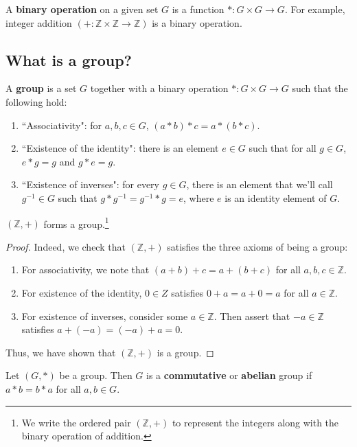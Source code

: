 \documentclass{article}
\theoremstyle{plain}
\newcommand{\Z}{\mathbb{Z}}
\begin{document}
\begin{definition}{}{}
A \textbf{binary operation} on a given set $G$ is a function $* : G \times G \rightarrow G$. For example, integer addition $(+ : \Z \times \Z \rightarrow \Z)$ is a binary operation.
\end{definition}

\subsection{What is a group?}

\begin{definition}{}{}
A \textbf{group} is a set $G$ together with a binary operation $* : G \times G \rightarrow G$ such that the following hold:
\begin{enumerate}[(1)]
\item ``Associativity": for $a,b,c \in G$, $(a*b)*c = a*(b*c)$.
\item ``Existence of the identity": there is an element $e \in G$ such that for all $g \in G$, $e*g = g$ and $g*e = g$.
\item ``Existence of inverses": for every $g \in G$, there is an element that we'll call $g^{-1} \in G$ such that $g*g^{-1}=g^{-1}*g=e$, where $e$ is an identity element of $G$.
\end{enumerate}
\end{definition}

\begin{theorem}{}{}
$(\Z,+)$ forms a group.\footnote{We write the ordered pair $(\Z,+)$ to represent the integers along with the binary operation of addition.}
\end{theorem}

\begin{proof}
Indeed, we check that $(\Z,+)$ satisfies the three axioms of being a group:
\begin{enumerate}[(1)]
\item For associativity, we note that $(a+b)+c = a+(b+c)$ for all $a,b,c \in \Z$.
\item For existence of the identity, $0 \in Z$ satisfies $0 + a = a+0 = a$ for all $a \in \Z$.
\item For existence of inverses, consider some $a \in \Z$. Then assert that $-a \in \Z$ satisfies $a+(-a)=(-a)+a=0$.
\end{enumerate}
Thus, we have shown that $(\Z,+)$ is a group.
\end{proof}

\begin{definition}{}{}
Let $(G,*)$ be a group. Then $G$ is a \textbf{commutative} or \textbf{abelian} group if $a*b = b*a$ for all $a,b \in G$.
\end{definition}
\end{document}
